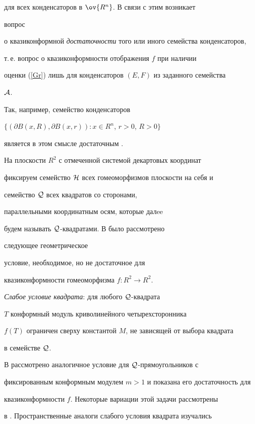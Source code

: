 для всех конденсаторов в $\ov{R^n}$. В связи с этим возникает 


вопрос 


о квазиконформной {\it достаточности} того или иного семейства конденсаторов, 


т.\,е. вопрос о квазиконформности отображения $f$ при наличии 


оценки (\ref{Gr}) лишь для конденсаторов $(E,F)$ из заданного семейства 


${\cal A}$. 


Так, например, семейство конденсаторов 


$\{ (\partial B(x,R), \partial B(x,r)): x\in R^n$, $r>0$, $R>0\}$ 


является в этом смысле достаточным \cite{Ger}. 





На плоскости $R^2$ с отмеченной системой декартовых координат 


фиксируем семейство ${\cal H}$ всех гомеоморфизмов плоскости на себя и 


семейство ${\cal Q}$ всех квадратов со сторонами, 


параллельными координатным осям, которые далee


будем называть ${\cal Q}$-квадратами. В \cite{GV} было рассмотрено 


следующее геометрическое 


условие, необходимое, но не достаточное для 


квазиконформности гомеоморфизма $f: R^2\to R^2$. 


 


{\it Слабое условие квадрата}: для любого ${\cal Q}$-квадрата 


$T$ конформный модуль криволинейного четырехсторонника 


$f(T)$ ограничен сверху константой $M$, не зависящей от выбора квадрата 


в семействе ${\cal Q}$.





В \cite{H} рассмотрено аналогичное условие для ${\cal Q}$-прямоугольников с 


фиксированным конформным модулем $m > 1$ и показана его достаточность для 


квазиконформности $f$. Некоторые вариации этой задачи рассмотрены 


в \cite{AsV}. Пространственные аналоги слабого условия квадрата изучались 


